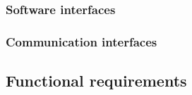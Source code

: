 \documentclass[12pt]{article}
\begin{document}
    \subsubsection{Software interfaces}
    \subsubsection{Communication interfaces}
  \subsection{Functional requirements}
\end{document}
